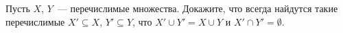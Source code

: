 Пусть $X$, $Y$~--- перечислимые множества. Докажите, что всегда найдутся такие перечислимые
$X' \subseteq X$, $Y' \subseteq Y$, что $X' \cup Y' = X \cup Y$ и $X' \cap Y' = \emptyset$.
